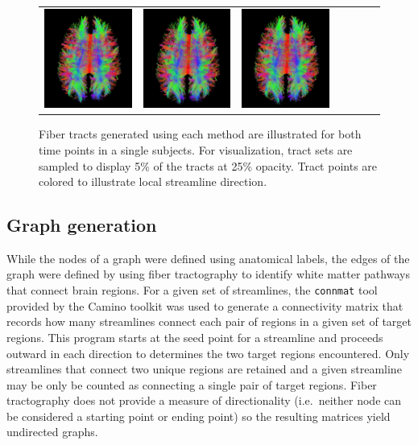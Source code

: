\documentclass{frontiersSCNS} %
\begin{document}
\begin{figure}
\begin{center}
\begin{tabular}{ccccccc}
\includegraphics[width=0.25\linewidth]{figures/113_33_euler.png} & 
\includegraphics[width=0.25\linewidth]{figures/113_33_rk4.png} & 
\includegraphics[width=0.25\linewidth]{figures/113_33_tend.png} \\
\end{tabular}
\caption{Fiber tracts generated using each method are illustrated for both time points in a single subjects. For visualization, tract sets are sampled to display 5\% of the tracts at 25\% opacity. Tract points are colored to illustrate local streamline direction.}
\label{fig:tracts}
\end{center}
\end{figure}


\subsection{Graph generation}
While the nodes of a graph were defined using anatomical labels, the edges of the graph were defined by using
fiber tractography to identify white matter pathways that connect brain regions. 
For a given set of streamlines, the \texttt{connmat} tool provided by  the Camino toolkit was used to generate
a connectivity matrix that records how many streamlines connect each pair of
regions in a given set of target regions. This program starts at the seed point for a streamline and proceeds outward in each
direction to determines the two target regions encountered. Only streamlines that connect two unique regions are retained and
a given streamline may be only be counted as connecting a single pair of target regions. Fiber tractography does not provide a measure
of directionality (i.e.\ neither node can be considered a starting point or ending point) so the resulting matrices yield undirected graphs.
\end{document}
